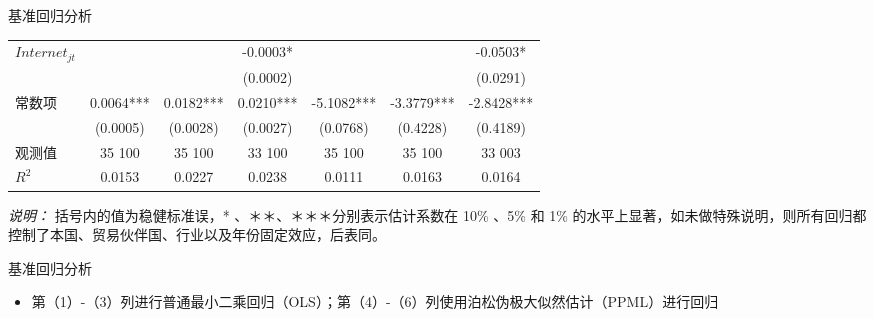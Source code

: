 \documentclass{beamer}
\begin{document}
\begin{frame}{基准回归分析}
{\begin{threeparttable}
\begin{tabular}{lcccccc}
        $Internet_{jt}$ & & & -0.0003* & & & -0.0503* \\
         & & & (0.0002) & & & (0.0291) \\
        常数项 & 0.0064*** & 0.0182*** & 0.0210*** & -5.1082*** & -3.3779*** & -2.8428*** \\
         & (0.0005) & (0.0028) & (0.0027) & (0.0768) & (0.4228) & (0.4189) \\
        观测值 & 35 100 & 35 100 & 33 100 & 35 100 & 35 100 & 33 003 \\
        $R^2$ & 0.0153 & 0.0227 & 0.0238 & 0.0111 & 0.0163 & 0.0164 \\
        \bottomrule
        \end{tabular}
        \begin{tablenotes}
        \item \textit{说明：} 括号内的值为稳健标准误，* 、＊＊、＊＊＊分别表示估计系数在 10\% 、5\% 和 1\% 的水平上显著，如未做特殊说明，则所有回归都控制了本国、贸易伙伴国、行业以及年份固定效应，后表同。
        \end{tablenotes}
        \end{threeparttable}
    }
\end{frame}

\begin{frame}{基准回归分析}
    \begin{itemize}
        \item 第（1）-（3）列进行普通最小二乘回归（OLS）；第（4）-（6）列使用泊松伪极大似然估计（PPML）进行回归
    \end{itemize}
\end{frame}
\end{document}
